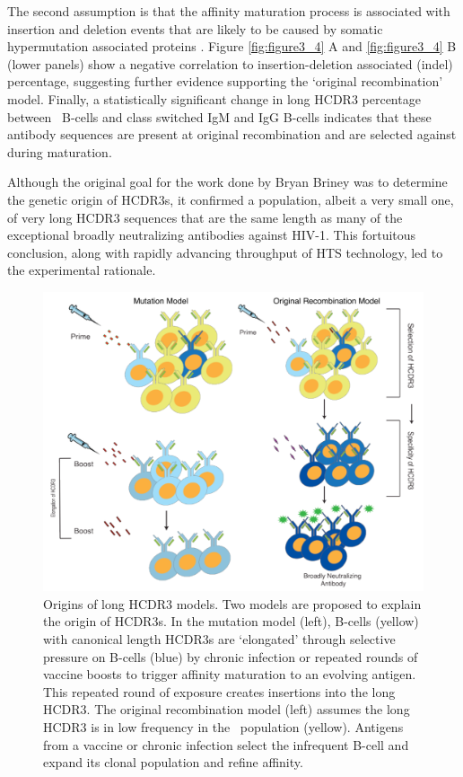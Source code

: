 The second assumption is that the affinity maturation process is associated with insertion and deletion events that are likely to be caused by somatic hypermutation associated proteins \citep{Reason:2006cp,Wilson:1998wo,Wilson:1998ut}. Figure \ref{fig:figure3_4} A and \ref{fig:figure3_4} B (lower panels) show a negative correlation to insertion-deletion associated (indel) percentage, suggesting further evidence supporting the `original recombination' model. Finally, a statistically significant change in long HCDR3 percentage between \naive~B-cells and class switched IgM and IgG B-cells indicates that these antibody sequences are present at original recombination and are selected against during maturation.

Although the original goal for the work done by Bryan Briney was to determine the genetic origin of HCDR3s, it confirmed a population, albeit a very small one, of very long HCDR3 sequences that are the same length as many of the exceptional broadly neutralizing antibodies against HIV-1. This fortuitous conclusion, along with rapidly advancing throughput of HTS technology, led to the experimental rationale.

\begin{figure}[!tH]
   \centering
   \includegraphics[width=.99\textwidth]{images/chapter3/figure3_2.pdf} %
   \caption[Origins of Long HCDR3 Models]{Origins of long HCDR3 models. Two models are proposed to explain the origin of HCDR3s. In the mutation model (left), B-cells (yellow) with canonical length HCDR3s are `elongated' through selective pressure on B-cells (blue) by chronic infection or repeated rounds of vaccine boosts to trigger affinity maturation to an evolving antigen. This repeated round of exposure creates insertions into the long HCDR3. The original recombination model (left) assumes the long HCDR3 is in low frequency in the \naive~population (yellow). Antigens from a vaccine or chronic infection select the infrequent B-cell and expand its clonal population and refine affinity.}
   \label{fig:figure3_2}
\end{figure}


